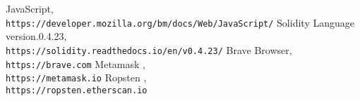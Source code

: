 \documentclass[]{scrreprt}
\begin{document}
\begin{thebibliography}{9}

		JavaScript,
		\\\texttt{https://developer.mozilla.org/bm/docs/Web/JavaScript/}
		Solidity Language version.0.4.23,
		\\\texttt{https://solidity.readthedocs.io/en/v0.4.23/}
		Brave Browser,
		\\\texttt{https://brave.com}
		Metamask ,
		\\\texttt{https://metamask.io}
			Ropsten , 
			\\\texttt{https://ropsten.etherscan.io}
		
\end{thebibliography}
\end{document}
